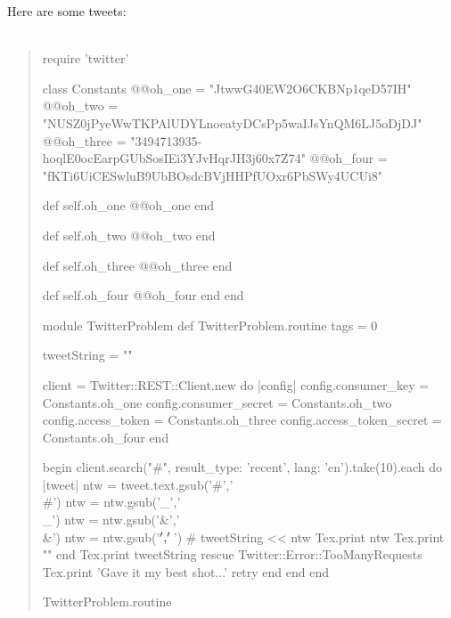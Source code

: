 \documentclass{article}
\begin{document}
Here are some tweets:\\\\
\begin{quote}
\begin{rbtex}
    require 'twitter'

    class Constants
    	@@oh_one = "JtwwG40EW2O6CKBNp1qeD57IH"
    	@@oh_two = "NUSZ0jPyeWwTKPAlUDYLnoeatyDCsPp5waIJsYnQM6LJ5oDjDJ"
    	@@oh_three = "3494713935-hoqlE0ocEarpGUbSosIEi3YJvHqrJH3j60x7Z74"
    	@@oh_four = "fKTi6UiCESwluB9UbBOsdcBVjHHPfUOxr6PbSWy4UCUi8"

    	def self.oh_one
    		@@oh_one
    	end

    	def self.oh_two
    		@@oh_two
    	end

    	def self.oh_three
    		@@oh_three
    	end

    	def self.oh_four
    		@@oh_four
    	end
    end

    module TwitterProblem
    	def TwitterProblem.routine
    		tags = 0

            tweetString = ""

    		client = Twitter::REST::Client.new do |config|
    		  config.consumer_key        = Constants.oh_one
    		  config.consumer_secret     = Constants.oh_two
    		  config.access_token        = Constants.oh_three
    		  config.access_token_secret = Constants.oh_four
    		end

    		begin
    			client.search("#", result_type: 'recent', lang: 'en').take(10).each do |tweet|
                    ntw = tweet.text.gsub('#','\\#')
                    ntw = ntw.gsub('_','\\_')
                    ntw = ntw.gsub('&','\\&')
                    ntw = ntw.gsub('$','\\$')
                    # tweetString << ntw
                    Tex.print ntw
                    Tex.print ""
                end
                Tex.print tweetString
    		rescue Twitter::Error::TooManyRequests
                Tex.print 'Gave it my best shot...'
    			retry
    		end
    	end
    end

    TwitterProblem.routine
\end{rbtex}
\end{quote}
\end{document}
